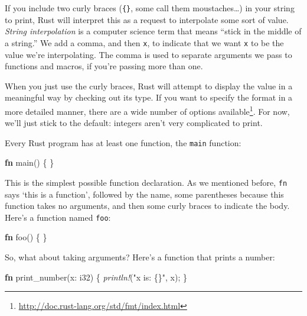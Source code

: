 \documentclass[a4paper,]{book}
\newenvironment{Shaded}{\begin{snugshade}}{\end{snugshade}}
\newcommand{\KeywordTok}[1]{\textcolor[rgb]{0.13,0.29,0.53}{\textbf{{#1}}}}
\newcommand{\DataTypeTok}[1]{\textcolor[rgb]{0.13,0.29,0.53}{{#1}}}
\newcommand{\StringTok}[1]{\textcolor[rgb]{0.31,0.60,0.02}{{#1}}}
\newcommand{\PreprocessorTok}[1]{\textcolor[rgb]{0.56,0.35,0.01}{\textit{{#1}}}}
\newcommand{\NormalTok}[1]{{#1}}
\renewcommand{\href}[2]{#2\footnote{\url{#1}}}
\begin{document}
If you include two curly braces (\texttt{\{\}}, some call them
moustaches\ldots{}) in your string to print, Rust will interpret this as
a request to interpolate some sort of value. \emph{String interpolation}
is a computer science term that means ``stick in the middle of a
string.'' We add a comma, and then \texttt{x}, to indicate that we want
\texttt{x} to be the value we're interpolating. The comma is used to
separate arguments we pass to functions and macros, if you're passing
more than one.

When you just use the curly braces, Rust will attempt to display the
value in a meaningful way by checking out its type. If you want to
specify the format in a more detailed manner, there are a
\href{http://doc.rust-lang.org/std/fmt/index.html}{wide number of
options available}. For now, we'll just stick to the default: integers
aren't very complicated to print.


Every Rust program has at least one function, the \texttt{main}
function:

\begin{Shaded}
\begin{Highlighting}[]
\KeywordTok{fn} \NormalTok{main() \{}
\NormalTok{\}}
\end{Highlighting}
\end{Shaded}

This is the simplest possible function declaration. As we mentioned
before, \texttt{fn} says `this is a function', followed by the name,
some parentheses because this function takes no arguments, and then some
curly braces to indicate the body. Here's a function named \texttt{foo}:

\begin{Shaded}
\begin{Highlighting}[]
\KeywordTok{fn} \NormalTok{foo() \{}
\NormalTok{\}}
\end{Highlighting}
\end{Shaded}

So, what about taking arguments? Here's a function that prints a number:

\begin{Shaded}
\begin{Highlighting}[]
\KeywordTok{fn} \NormalTok{print_number(x: }\DataTypeTok{i32}\NormalTok{) \{}
    \PreprocessorTok{println!}\NormalTok{(}\StringTok{"x is: \{\}"}\NormalTok{, x);}
\NormalTok{\}}
\end{Highlighting}
\end{Shaded}
\end{document}
